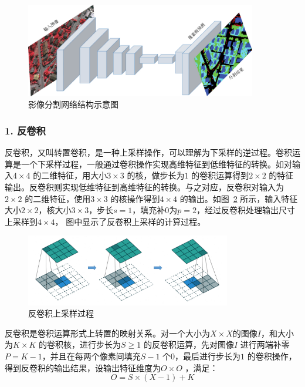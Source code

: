 \begin{figure}[htb]
  \centering
  \includegraphics[width=0.9\textwidth]{figures/FCN}
  \caption{影像分割网络结构示意图}\label{fig:fcn_structure}
\end{figure}

\subsubsection*{1. 反卷积}
\label{subsec:chap02-2-2-1}
反卷积，又叫转置卷积，是一种上采样操作，可以理解为下采样的逆过程。卷积运算是一个下采样过程，一般通过卷积操作实现高维特征到低维特征的转换。如对输入$4\times 4$ 的二维特征，用大小$3\times 3$ 的核，做步长为$1$ 的卷积运算得到$2\times 2$ 的特征输出。反卷积则实现低维特征到高维特征的转换。与之对应，反卷积对输入为$2\times 2$ 的二维特征，使用$3\times 3$ 的核操作得到$4\times 4$ 的输出。如图~\ref{fig:deconv} 所示，输入特征大小$2\times 2$，核大小$3\times 3$，步长$s=1$，填充补0为$p=2$，经过反卷积处理输出尺寸上采样到$4\times 4$， 图中显示了反卷积上采样的计算过程。

\begin{figure}[htb]
  \centering
  \includegraphics[width=0.8\textwidth]{figures/deconv}
  \caption{反卷积上采样过程}\label{fig:deconv}
\end{figure}

反卷积是卷积运算形式上转置的映射关系。对一个大小为$X\times X$的图像$\textit{I}$，和大小为$K\times K$ 的卷积核，进行步长为$S \geq 1$ 的反卷积运算，先对图像$\textit{I}$ 进行两端补零$P=K-1$，并且在每两个像素间填充$S-1$ 个$0$，最后进行步长为$1$ 的卷积操作，得到反卷积的输出结果，设输出特征维度为$O \times O$ ，满足：
\begin{equation}
  \label{eq:2-19}
  O = S \times (X - 1) + K
\end{equation}

